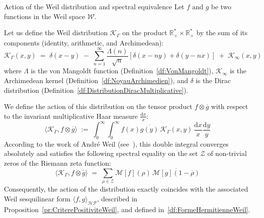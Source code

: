 \documentclass[Riemann_Hypothesis.tex]{subfiles}
\begin{document}
\begin{lemmaEn}[label=lm:EquivalenceFormeWeil]{Action of the Weil distribution and spectral equivalence}
    Let $f$ and $g$ be two functions in the Weil space $\mathcal{W}$. \par
    Let us define the Weil distribution $\mathcal{K}_{\Gamma}$ on the product $\mathbb{R}_+^* \times \mathbb{R}_+^*$ by the sum of its components (identity, arithmetic, and Archimedean):
    \begin{equation*}
        \mathcal{K}_{\Gamma}(x,y) \;=\; \delta(x-y) \;-\; \sum_{n=1}^{\infty} \frac{\Lambda(n)}{\sqrt{n}} \left[ \delta\left(x - ny\right) + \delta\left(y - nx\right) \right] \;+\; \mathcal{K}_{\infty}(x,y)
    \end{equation*}
    where $\Lambda$ is the von Mangoldt function (Definition~\ref{df:VonMangoldt}), $\mathcal{K}_{\infty}$ is the Archimedean kernel (Definition~\ref{df:NoyauArchimedien}), and $\delta$ is the Dirac distribution (Definition~\ref{df:DistributionDiracMultiplicative}). \par
    We define the action of this distribution on the tensor product $f \otimes \overline{g}$ with respect to the invariant multiplicative Haar measure $\frac{\mathrm{d}x}{x}$:
    \begin{equation*}
        \langle \mathcal{K}_{\Gamma}, f \otimes \overline{g} \rangle \;:=\; \int_{0}^{\infty} \int_{0}^{\infty} f(x) \overline{g(y)} \, \mathcal{K}_{\Gamma}(x,y) \, \frac{\mathrm{d}x}{x} \frac{\mathrm{d}y}{y}
    \end{equation*}
    According to the work of André Weil (see~\cite{weil1952_formules_en}), this double integral converges absolutely and satisfies the following spectral equality on the set $\mathcal{Z}$ of non-trivial zeros of the Riemann zeta function:
    \begin{equation*}
        \langle \mathcal{K}_{\Gamma}, f \otimes \overline{g} \rangle \;=\; \sum_{\rho \in \mathcal{Z}} \mathcal{M}[f](\rho) \, \overline{\mathcal{M}[g](1 - \overline{\rho})}
    \end{equation*}
    Consequently, the action of the distribution exactly coincides with the associated Weil sesquilinear form $\langle f, g \rangle_{\mathcal{HP}}$, described in {Proposition}~\ref{pr:CriterePositiviteWeil}, and defined in~\ref{df:FormeHermitienneWeil}.
\end{lemmaEn}
\end{document}
